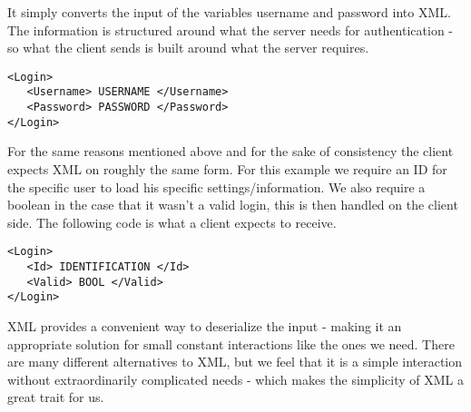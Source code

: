 It simply converts the input of the variables username and password into XML. The information is structured around what the server needs for authentication - so what the client sends is built around what the server requires.

\begin{lstlisting}
<Login>
   <Username> USERNAME </Username>
   <Password> PASSWORD </Password>
</Login>
\end{lstlisting}

For the same reasons mentioned above and for the sake of consistency the client expects XML on roughly the same form. For this example we require an ID for the specific user to load his specific settings/information. We also require a boolean in the case that it wasn't a valid login, this is then handled on the client side. The following code is what a client expects to receive.

\begin{lstlisting}
<Login>
   <Id> IDENTIFICATION </Id>
   <Valid> BOOL </Valid>
</Login>
\end{lstlisting}

XML provides a convenient way to deserialize the input - making it an appropriate solution for small constant interactions like the ones we need. There are many different alternatives to XML, but we feel that it is a simple interaction without extraordinarily complicated needs - which makes the simplicity of XML a great trait for us.





